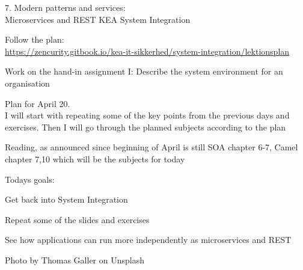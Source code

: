 \documentclass[Screen16to9,17pt]{foils}
\begin{document}
\mytitlepage
{7. Modern patterns and services:\\ Microservices and REST}
{KEA System Integration}


\begin{list2}
\item Follow the plan:\\
\url{https://zencurity.gitbook.io/kea-it-sikkerhed/system-integration/lektionsplan}
\item Work on the hand-in assignment I: Describe the system environment for an organisation
\item Plan for April 20.\\
I will start with repeating some of the key points from the previous days and exercises.
Then I will go through the planned subjects according to the plan
\item Reading, as announced since beginning of April is still
SOA chapter 6-7, Camel chapter 7,10 which will be the subjects for today
\end{list2}



Todays goals:
\begin{list2}
\item Get back into System Integration
\item Repeat some of the slides and exercises
\item See how applications can run more independently as microservices and REST
\end{list2}

Photo by Thomas Galler on Unsplash
\end{document}
